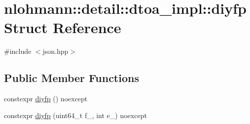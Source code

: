 \hypertarget{structnlohmann_1_1detail_1_1dtoa__impl_1_1diyfp}{}\section{nlohmann\+:\+:detail\+:\+:dtoa\+\_\+impl\+:\+:diyfp Struct Reference}
\label{structnlohmann_1_1detail_1_1dtoa__impl_1_1diyfp}


{\ttfamily \#include $<$json.\+hpp$>$}

\subsection*{Public Member Functions}
\begin{DoxyCompactItemize}
\item 
constexpr \hyperlink{structnlohmann_1_1detail_1_1dtoa__impl_1_1diyfp_a23d25b3ad4527270a6e3f2a0bcca11e6}{diyfp} () noexcept
\item 
constexpr \hyperlink{structnlohmann_1_1detail_1_1dtoa__impl_1_1diyfp_a332ba792e67dd40cd99a23f6dceb7792}{diyfp} (uint64\+\_\+t f\+\_\+, int e\+\_\+) noexcept
\end{DoxyCompactItemize}
